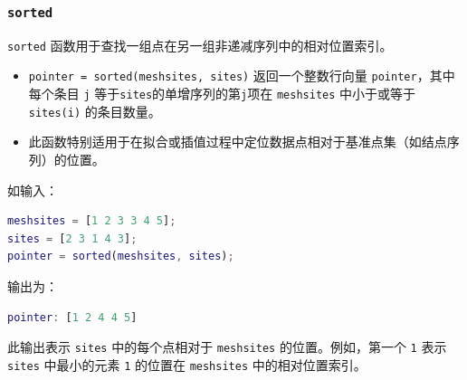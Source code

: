 \subsubsection{\texttt{sorted}}
\texttt{sorted} 函数用于查找一组点在另一组非递减序列中的相对位置索引。
\begin{itemize}
\item \texttt{pointer = sorted(meshsites, sites)} 返回一个整数行向量 \texttt{pointer}，其中每个条目 \texttt{j} 等于\texttt{sites}的单增序列的第\texttt{j}项在 \texttt{meshsites} 中小于或等于 \texttt{sites(i)} 的条目数量。
\item 此函数特别适用于在拟合或插值过程中定位数据点相对于基准点集（如结点序列）的位置。
\end{itemize}
如输入：
\begin{lstlisting}[language = Matlab]
meshsites = [1 2 3 3 4 5];
sites = [2 3 1 4 3];
pointer = sorted(meshsites, sites);
\end{lstlisting}
输出为：
\begin{lstlisting}[language = Matlab]
pointer: [1 2 4 4 5]
\end{lstlisting}
此输出表示 \texttt{sites} 中的每个点相对于 \texttt{meshsites} 的位置。例如，第一个 \texttt{1} 表示 \texttt{sites} 中最小的元素 \texttt{1} 的位置在 \texttt{meshsites} 中的相对位置索引。
